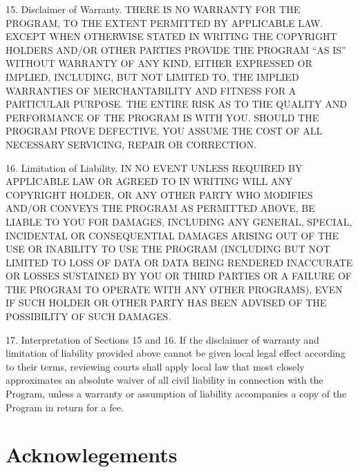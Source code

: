 \documentclass {scrbook}
\begin{document}
\begin{tiny}
15. Disclaimer of Warranty. THERE IS NO WARRANTY FOR THE PROGRAM, TO THE EXTENT PERMITTED BY APPLICABLE LAW. EXCEPT WHEN OTHERWISE STATED IN WRITING THE COPYRIGHT HOLDERS AND/OR OTHER PARTIES PROVIDE THE PROGRAM ``AS IS'' WITHOUT WARRANTY OF ANY KIND, EITHER EXPRESSED OR IMPLIED, INCLUDING, BUT NOT LIMITED TO, THE IMPLIED WARRANTIES OF MERCHANTABILITY AND FITNESS FOR A PARTICULAR PURPOSE. THE ENTIRE RISK AS TO THE QUALITY AND PERFORMANCE OF THE PROGRAM IS WITH YOU. SHOULD THE PROGRAM PROVE DEFECTIVE, YOU ASSUME THE COST OF ALL NECESSARY SERVICING, REPAIR OR CORRECTION.

16. Limitation of Liability. IN NO EVENT UNLESS REQUIRED BY APPLICABLE LAW OR AGREED TO IN WRITING WILL ANY COPYRIGHT HOLDER, OR ANY OTHER PARTY WHO MODIFIES AND/OR CONVEYS THE PROGRAM AS PERMITTED ABOVE, BE LIABLE TO YOU FOR DAMAGES, INCLUDING ANY GENERAL, SPECIAL, INCIDENTAL OR CONSEQUENTIAL DAMAGES ARISING OUT OF THE USE OR INABILITY TO USE THE PROGRAM (INCLUDING BUT NOT LIMITED TO LOSS OF DATA OR DATA BEING RENDERED INACCURATE OR LOSSES SUSTAINED BY YOU OR THIRD PARTIES OR A FAILURE OF THE PROGRAM TO OPERATE WITH ANY OTHER PROGRAMS), EVEN IF SUCH HOLDER OR OTHER PARTY HAS BEEN ADVISED OF THE POSSIBILITY OF SUCH DAMAGES.

17. Interpretation of Sections 15 and 16. If the disclaimer of warranty and limitation of liability provided above cannot be given local legal effect according to their terms, reviewing courts shall apply local law that most closely approximates an absolute waiver of all civil liability in connection with the Program, unless a warranty or assumption of liability accompanies a copy of the Program in return for a fee.

\end{tiny}


\chapter{Acknowlegements}
\end{document}
